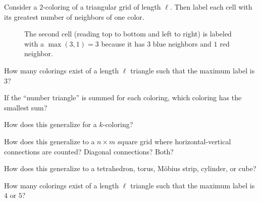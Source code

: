 \documentclass{article}
\begin{document}
  Consider a $2$-coloring of a triangular grid of length $\ell$. Then label each
  cell with its greatest number of neighbors of one color.\\\vspace{0.5cm}
\begin{figure}[!h]
  \centering

  \caption{
    The second cell (reading top to bottom and left to right) is labeled with a
    $\max(3, 1) = 3$ because it has $3$ blue neighbors and $1$ red neighbor.
  }
\end{figure}

\begin{question}
  How many colorings exist of a length $\ell$ triangle such that the maximum
  label is $3$?
\end{question}
\begin{related}
  \item If the ``number triangle'' is summed for each coloring, which coloring
    has the smallest sum?
  \item How does this generalize for a $k$-coloring?
  \item How does this generalize to a $n \times m$ square grid where
    horizontal-vertical connections are counted? Diagonal connections? Both?
  \item How does this generalize to a tetrahedron, torus, M\"obius strip,
    cylinder, or cube?
  \item How many colorings exist of a length $\ell$ triangle such that the maximum
    label is $4$ or $5$?
\end{related}
\end{document}
